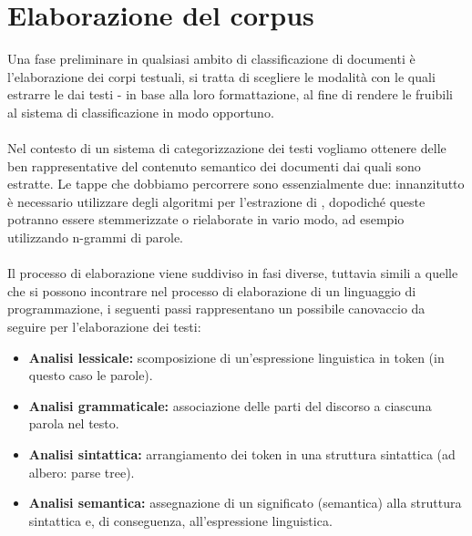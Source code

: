 \documentclass{article}
\theoremstyle{plain}
\theoremstyle{definition}
\begin{document}
\section{Elaborazione del corpus}
Una fase preliminare in qualsiasi ambito di classificazione di documenti è l'elaborazione dei corpi testuali, si tratta di scegliere le modalità con le quali estrarre le  dai testi - in base alla loro formattazione, al fine di rendere le  fruibili al sistema di classificazione in modo opportuno.
\\
\\
Nel contesto di un sistema di categorizzazione dei testi vogliamo ottenere delle  ben rappresentative del contenuto semantico dei documenti dai quali sono estratte. Le tappe che dobbiamo percorrere sono essenzialmente due: innanzitutto è necessario utilizzare degli algoritmi per l'estrazione di , dopodiché queste  potranno essere stemmerizzate o rielaborate in vario modo, ad esempio utilizzando n-grammi di parole. 
\\
\\
Il processo di elaborazione viene suddiviso in fasi diverse, tuttavia simili a quelle che si possono incontrare nel processo di elaborazione di un linguaggio di programmazione, i seguenti passi rappresentano un possibile canovaccio da seguire per l'elaborazione dei testi:

\begin{itemize}
\item \textbf{Analisi lessicale:} scomposizione di un'espressione linguistica in token (in questo caso le parole).
\item \textbf{Analisi grammaticale:} associazione delle parti del discorso a ciascuna parola nel testo.
\item \textbf{Analisi sintattica:} arrangiamento dei token in una struttura sintattica (ad albero: parse tree).
\item  \textbf{Analisi semantica:} assegnazione di un significato (semantica) alla struttura sintattica e, di conseguenza, all'espressione linguistica.
\end{itemize}
\end{document}
